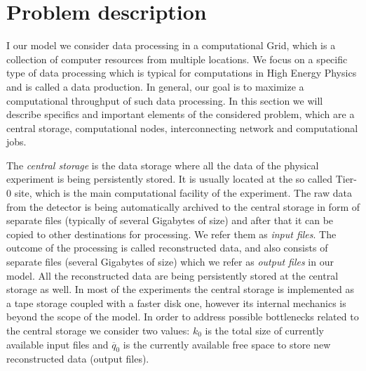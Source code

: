 \documentclass{svjour3}                     %
\begin{document}
\section{Problem description}
\label{problem}
I our model we consider data processing in a computational Grid, which is a collection of computer resources from multiple locations.  We focus on a specific type of data processing which is typical for computations in High Energy Physics and is called a data production. In general, our goal is to maximize a computational throughput of such data processing. In this section we will describe specifics and important elements of the considered problem, which are a central storage, computational nodes, interconnecting network and computational jobs.

The \textit{central storage} is the data storage where all the data of the physical experiment is being persistently stored. It is usually located at the so called Tier-0 site, which is the main computational facility of the experiment.  The raw data from the detector is being automatically archived to the central storage in form of separate files (typically of several Gigabytes of size) and after that it can be copied to other destinations for processing. We refer them as \textit{input files}. The outcome of the processing is called reconstructed data, and also consists of separate files (several Gigabytes of size) which we refer as \textit{output files} in our model. All the reconstructed data are being persistently stored at the central storage as well. In most of the experiments the central storage is implemented as a tape storage coupled with a faster disk one, however its internal mechanics is beyond the scope of the model. In order to address possible bottlenecks related to the central storage we consider two values: $k_{0}$ is the total size of currently available input files and $\overline{q}_{0}$ is the currently available free space to store new reconstructed data (output files).
\end{document}

